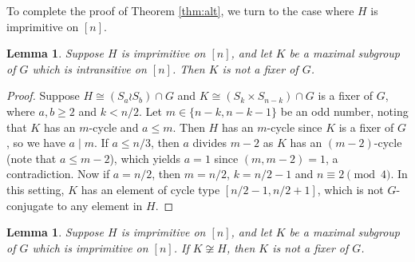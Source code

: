 \documentclass[twoside,a4paper,reqno,11pt]{amsart}
\newcommand{\<}{\langle}
\renewcommand{\>}{\rangle}
\newcommand{\leqs}{\leqslant}
\newcommand{\geqs}{\geqslant}
\newtheorem{lem}[thm]{Lemma}
\theoremstyle{definition}
\begin{document}
	
	To complete the proof of Theorem \ref{thm:alt}, we turn to the case where $H$ is imprimitive on $[n]$.
	
	\begin{lem}
		\label{l:max_An_K_imprim_H_intrans}
		Suppose $H$ is imprimitive on $[n]$, and let $K$ be a maximal subgroup of $G$ which is intransitive on $[n]$. Then $K$ is not a fixer of $G$.
	\end{lem}
	
	\begin{proof}
		Suppose $H\cong (S_a\wr S_b)\cap G$ and $K\cong (S_k\times S_{n-k})\cap G$ is a fixer of $G$, where $a,b\geqs 2$ and $k< n/2$. Let $m\in\{n-k,n-k-1\}$ be an odd number, noting that $K$ has an $m$-cycle and $a\leqs m$. Then $H$ has an $m$-cycle since $K$ is a fixer of $G$, so we have $a\mid m$. If $a\leqs n/3$, then $a$ divides $m-2$ as $K$ has an $(m-2)$-cycle (note that $a \leqs m-2$), which yields $a = 1$ since $(m,m-2) = 1$, a contradiction. Now if $a = n/2$, then $m =n/2$, $k = n/2-1$ and $n\equiv 2\pmod 4$. In this setting, $K$ has an element of cycle type $[n/2-1,n/2+1]$, which is not $G$-conjugate to any element in $H$.
	\end{proof}
	
	
	
	
	\begin{lem}
		\label{l:max_An_K_imprim_H_imprim}
		Suppose $H$ is imprimitive on $[n]$, and let $K$ be a maximal subgroup of $G$ which is imprimitive on $[n]$. If $K\not\cong H$, then $K$ is not a fixer of $G$.
	\end{lem}
	
\end{document}
